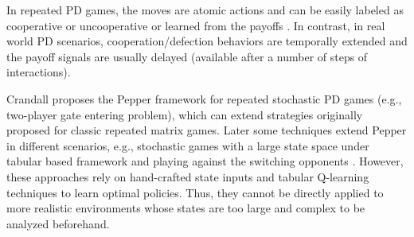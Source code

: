 \documentclass{article}
\begin{document}
\begin{comment}
In repeated PD games, the moves are atomic actions and can be easily labeled as cooperative or uncooperative or learned from the payoffs \cite{busoniu2008comprehensive}. In contrast, in real world PD scenarios, cooperation/defection behaviors are temporally extended and the payoff signals are usually delayed (available after a number of steps of interactions).
Crandall \shortcite{crandall2012just} proposes the Pepper framework for repeated stochastic PD games (e.g., two-player gate entering problem) which allows extending strategies originally proposed for classic repeated matrix games. Later Elidrisi et al. \cite{elidrisi2014fast} extend Pepper using the meta game abstraction model to accelerate the learning speed in stochastic games with a large state space. Hernandez-Leal and Kaisers \cite{Hernandez2017Towards} combine Pepper and Bayesian policy reuse for the agent to play against its switching opponents. However, the above approaches rely  on hand-crafted state inputs and tabular Q-learning techniques to learn optimal control policies. They cannot be directly applied to more realistic environments whose states are too large and complex to be analyzed beforehand.
\end{comment}
In repeated PD games, the moves are atomic actions and can be easily labeled as cooperative or uncooperative or learned from the payoffs \cite{busoniu2008comprehensive}. In contrast, in real world PD scenarios, cooperation/defection behaviors are temporally extended and the payoff signals are usually delayed (available after a number of steps of interactions).

Crandall  proposes the Pepper framework for repeated stochastic PD games (e.g., two-player gate entering problem), which can extend strategies originally proposed for classic repeated matrix games. Later some techniques extend Pepper in different scenarios, e.g., stochastic games with a large state space under tabular based framework \cite{elidrisi2014fast} and playing against the switching opponents \cite{Hernandez2017Towards}. However, these approaches rely  on hand-crafted state inputs and tabular Q-learning techniques to learn optimal policies. Thus, they cannot be directly applied to more realistic environments whose states are too large and complex to be analyzed beforehand.
\end{document}
